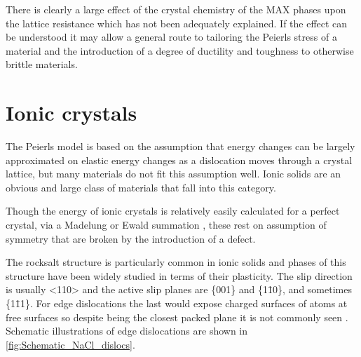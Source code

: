 There is clearly a large effect of the crystal chemistry of the MAX phases upon the lattice resistance which has not been adequately explained. If the effect can be understood it may allow a general route to tailoring the Peierls stress of a material and the introduction of a degree of ductility and toughness to otherwise brittle materials.






































\FloatBarrier
\section{Ionic crystals}
\FloatBarrier
\label{sec:ionic_crystals}


The Peierls model is based on the assumption that energy changes can be largely approximated on elastic energy changes as a dislocation moves through a crystal lattice, but many materials do not fit this assumption well. Ionic solids are an obvious and large class of materials that fall into this category.

Though the energy of ionic crystals is relatively easily calculated for a perfect crystal, via a Madelung or Ewald summation \cite{madelung1918,Ewald1921}, these rest on assumption of symmetry that are broken by the introduction of a defect.

The rocksalt structure is particularly common in ionic solids and phases of this structure have been widely studied in terms of their plasticity. The slip direction is usually <110> and the active slip planes are \{001\} and \{1\={1}0\}, and sometimes \{1\={1}1\}. For edge dislocations the last would expose charged surfaces of atoms at free surfaces so despite being the closest packed plane it is not commonly seen \cite{Haasen1985}. Schematic illustrations of edge dislocations are shown in \autoref{fig:Schematic_NaCl_dislocs}.

